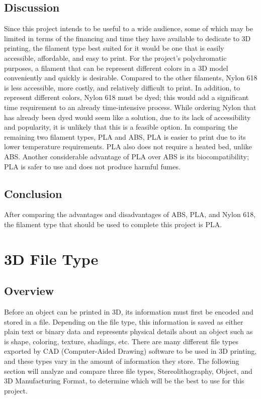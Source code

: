 \documentclass[letterpaper, onecolumn, draftclsnofoot, 10pt, compsoc]{IEEEtran}
\begin{document}
\begin{singlespace}
\subsection{Discussion}
Since this project intends to be useful to a wide audience, some of which may be limited in terms of the financing and time they have available to dedicate to 3D printing, the filament type best suited for it would be one that is easily accessible, affordable, and easy to print.
For the project's polychromatic purposes, a filament that can be represent different colors in a 3D model conveniently and quickly is desirable.
Compared to the other filaments, Nylon 618 is less accessible, more costly, and relatively difficult to print.
In addition, to represent different colors, Nylon 618 must be dyed; this would add a significant time requirement to an already time-intensive process.
While ordering Nylon that has already been dyed would seem like a solution, due to its lack of accessibility and popularity, it is unlikely that this is a feasible option.
In comparing the remaining two filament types, PLA and ABS, PLA is easier to print due to its lower temperature requirements. 
PLA also does not require a heated bed, unlike ABS. 
Another considerable advantage of PLA over ABS is its biocompatibility; PLA is safer to use and does not produce harmful fumes.
\subsection{Conclusion}
After comparing the advantages and disadvantages of ABS, PLA, and Nylon 618, the filament type that should be used to complete this project is PLA.

\section{3D File Type}
\subsection{Overview}
Before an object can be printed in 3D, its information must first be encoded and stored in a file. 
Depending on the file type, this information is saved as either plain text or binary data and represents physical details about an object such as is shape, coloring, texture, shadings, etc. \cite{all3dpweb}
There are many different file types exported by CAD (Computer-Aided Drawing) software to be used in 3D printing, and these types vary in the amount of information they store.
The following section will analyze and compare three file types, Stereolithography, Object, and 3D Manufacturing Format, to determine which will be the best to use for this project.
 

\end{singlespace}
\end{document}
